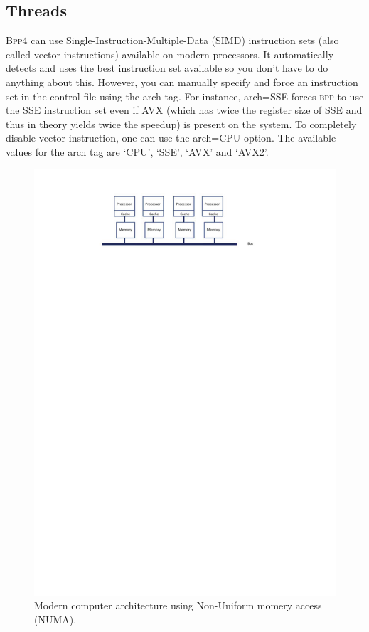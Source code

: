 \documentclass[a4paper]{book}
\numberwithin{equation}{section} \renewcommand{\baselinestretch}{0.55}
\begin{document}
\subsection{Threads}

\textsc{Bpp4} can use Single-Instruction-Multiple-Data (SIMD)
instruction sets (also called vector instructions) available on modern
processors.  It automatically detects and uses the best instruction
set available so you don’t have to do anything about this.  However,
you can manually specify and force an instruction set in the control
file using the arch tag.  For instance, arch=SSE forces \textsc{bpp}
to use the SSE instruction set even if AVX (which has twice the
register size of SSE and thus in theory yields twice the speedup) is
present on the system. To completely disable vector instruction, one
can use the arch=CPU option.  The available values for the arch tag
are ‘CPU’, ‘SSE’, ‘AVX’ and ‘AVX2’.

\begin{figure} [t]
  \centering \includegraphics[scale=0.7890]{figures/fig-numa}

  \caption{Modern computer architecture using Non-Uniform momery
    access (NUMA).  }  \label{fig-numa}
\end{figure}
\end{document}
